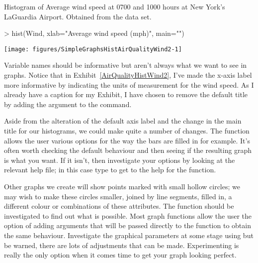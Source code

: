 \begin{exhibit} 
\begin{center} 
\caption{Histogram of Average wind speed at 0700 and 1000 hours at New York's LaGuardia Airport. Obtained from the  data set.} 
\label{AirQualityHistWind2} 

\begin{Schunk}
\begin{Sinput}
> hist(Wind, xlab="Average wind speed (mph)", main="") 
\end{Sinput}
\end{Schunk}
\texttt{[image: figures/SimpleGraphsHistAirQualityWind2-1]} 


\end{center} 
\end{exhibit} 
 
Variable names should be informative but aren't always what we want to see in graphs. Notice that in Exhibit~\ref{AirQualityHistWind2}, I've made the x-axis label more informative by indicating the units of measurement for the wind speed. As I already have a caption for my Exhibit, I have chosen to remove the default title by adding the argument  to the  command. 
 
Aside from the alteration of the default axis label and the change in the main title for our histograms, we could make quite a number of changes. The  function allows the user various options for the way the bars are filled in for example. It's often worth checking the default behaviour and then seeing if the resulting graph is what you want. If it isn't, then investigate your options by looking at the relevant help file; in this case type  to get to the help for the  function. 
 
 Other graphs we create will show points marked with small hollow circles; we may wish to make these circles smaller, joined by line segments, filled in, a different colour or combinations of these attributes. The  function should be investigated to find out what is possible. Most graph functions allow the user the option of adding arguments that will be passed directly to the  function to obtain the same behaviour. Investigate the graphical parameters at some stage using  but be warned, there are lots of adjustments that can be made. Experimenting is really the only option when it comes time to get your graph looking perfect. 
 
